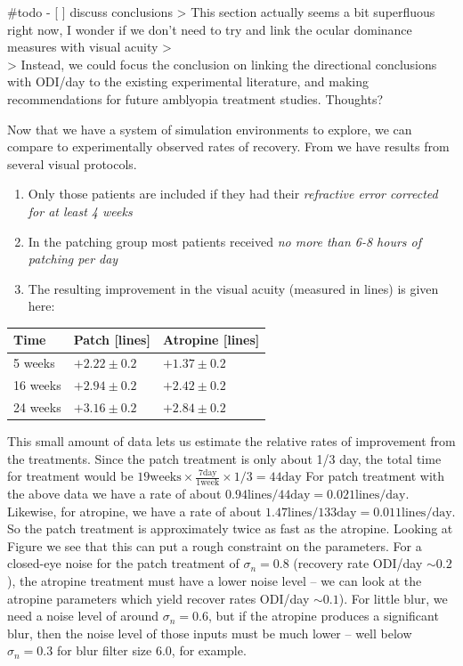 \documentclass[
  letterpaper,
  number]{elsarticle}
\providecommand{\tightlist}{%
  \setlength{\itemsep}{0pt}\setlength{\parskip}{0pt}}\usepackage{longtable,booktabs,array}
\begin{document}
\#todo - {[} {]} discuss conclusions \textgreater{} This section
actually seems a bit superfluous right now, I wonder if we don't need to
try and link the ocular dominance measures with visual acuity
\textgreater{}\\
\textgreater{} Instead, we could focus the conclusion on linking the
directional conclusions with ODI/day to the existing experimental
literature, and making recommendations for future amblyopia treatment
studies. Thoughts?

Now that we have a system of simulation environments to explore, we can
compare to experimentally observed rates of recovery. From
\citep{glaser2002randomized} we have results from several visual
protocols.

\begin{enumerate}
\def\labelenumi{\arabic{enumi}.}
\tightlist
\item
  Only those patients are included if they had their \emph{refractive
  error corrected for at least 4 weeks}
\item
  In the patching group most patients received \emph{no more than 6-8
  hours of patching per day}
\item
  The resulting improvement in the visual acuity (measured in lines) is
  given here:
\end{enumerate}

\begin{longtable}[]{@{}lll@{}}
\toprule()
Time & Patch {[}lines{]} & Atropine {[}lines{]} \\
\midrule()
\endhead
5 weeks & \(+2.22 \pm 0.2\) & \(+1.37 \pm 0.2\) \\
16 weeks & \(+2.94 \pm 0.2\) & \(+2.42 \pm 0.2\) \\
24 weeks & \(+3.16 \pm 0.2\) & \(+2.84 \pm 0.2\) \\
\bottomrule()
\end{longtable}

This small amount of data lets us estimate the relative rates of
improvement from the treatments. Since the patch treatment is only about
1/3 day, the total time for treatment would be
\(19 \text{weeks}\times \frac{7 \text{day}}{1 \text{week}}\times 1/3=44 \text{day}\)
For patch treatment with the above data we have a rate of about
\(0.94 \text{lines} / 44 \text{day}=0.021 \text{lines}/\text{day}\).
Likewise, for atropine, we have a rate of about
\(1.47\text{lines} / 133 \text{day}=0.011 \text{lines}/\text{day}\). So
the patch treatment is approximately twice as fast as the atropine.
Looking at Figure \citep{fig:dODI_atropine_vs_blur} we see that this can
put a rough constraint on the parameters. For a closed-eye noise for the
patch treatment of \(\sigma_n=0.8\) (recovery rate ODI/day
\(\sim 0.2\)), the atropine treatment must have a lower noise level --
we can look at the atropine parameters which yield recover rates ODI/day
\(\sim 0.1\)). For little blur, we need a noise level of around
\(\sigma_n=0.6\), but if the atropine produces a significant blur, then
the noise level of those inputs must be much lower -- well below
\(\sigma_n=0.3\) for blur filter size 6.0, for example.
\end{document}
